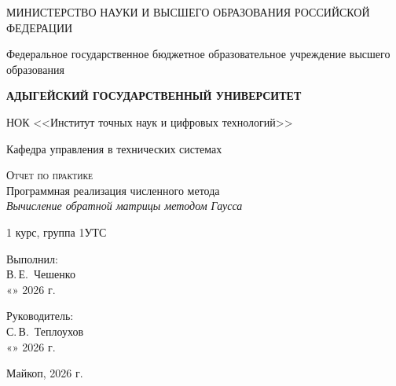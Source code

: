 \documentclass[12pt,a4paper]{scrartcl}
\begin{document}
\begin{titlepage}
    \begin{center}
        \large
        МИНИСТЕРСТВО НАУКИ И ВЫСШЕГО ОБРАЗОВАНИЯ РОССИЙСКОЙ ФЕДЕРАЦИИ

        Федеральное государственное бюджетное образовательное учреждение
        высшего образования

        \textbf{АДЫГЕЙСКИЙ ГОСУДАРСТВЕННЫЙ УНИВЕРСИТЕТ}
        \vspace{0.25cm}

        НОК <<Институт точных наук и цифровых технологий>>

        Кафедра управления в технических системах
        \vfill

        \textsc{Отчет по практике}\\[5mm]

        {\LARGE Программная реализация численного метода\\[3mm]
        \textit{Вычисление обратной матрицы методом Гаусса}}
        \bigskip

        1 курс, группа 1УТС
    \end{center}
    \vfill

    \newlength{\ML}
    \hfill\begin{minipage}{0.5\textwidth}
        Выполнил:\\
        \underline{\hspace{\ML}} В.\,Е.~Чешенко\\
        «\underline{\hspace{0.7cm}}» \underline{\hspace{2cm}} 2026 г.
    \end{minipage}%
    \bigskip

    \hfill\begin{minipage}{0.5\textwidth}
        Руководитель:\\
        \underline{\hspace{\ML}} С.\,В.~Теплоухов\\
        «\underline{\hspace{0.7cm}}» \underline{\hspace{2cm}} 2026 г.
    \end{minipage}%
    \vfill

    \begin{center}
        Майкоп, 2026 г.
    \end{center}
\end{titlepage}
\end{document}
